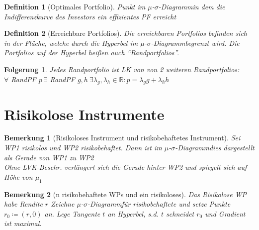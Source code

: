 \documentclass[a4paper]{article}
\theoremstyle{break}
\newcommand{\msd}{$\mu$-$\sigma$-Diagramm}
\newtheorem{defi}{Definition}[section]
\newtheorem{ann}{Bemerkung}[section]
\newtheorem{der}{Folgerung}[section]
\begin{document}
    \begin{defi}[Optimales Portfolio]
        Punkt im \msd in dem die Indifferenzkurve des Investors ein effizientes PF erreicht
    \end{defi}
    \begin{defi}[Erreichbare Portfolios]
        Die erreichbaren Portfolios befinden sich in der Fläche, welche durch die Hyperbel im \msd begrenzt wird.
        Die Portfolios auf der Hyperbel heißen auch ``Randportfolios''.
    \end{defi}
    \begin{der}
        Jedes Randportfolio ist LK von von 2 weiteren Randportfolios:\\
        $\forall$ RandPF $p ~ \exists$ RandPF $g, h ~ \exists \lambda_g, \lambda_h \in \mathbb{R}: p = \lambda_g g + \lambda_h h$
    \end{der}
\section{Risikolose Instrumente}
    \begin{ann}[Risikoloses Instrument und risikobehaftetes Instrument]
        Sei WP1 risikolos und WP2 risikobehaftet. Dann ist im \msd dies dargestellt als Gerade von WP1 zu WP2\\
        Ohne LVK-Beschr. verlängert sich die Gerade hinter WP2 und spiegelt sich auf Höhe von $\mu_1$
    \end{ann}
    \begin{ann}[n risikobehaftete WPs und ein risikoloses]
        Das Risikolose WP habe Rendite $r$
        Zeichne \msd für risikobehaftete und setze Punkte $r_0 \coloneqq (r,0)$ an. Lege Tangente $t$ an Hyperbel, s.d. $t$ schneidet $r_0$ und Gradient ist maximal. 
    \end{ann}
\end{document}
